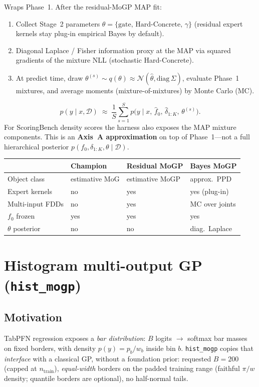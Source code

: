 \documentclass[11pt,a4paper]{article}
\newcommand{\Ncal}{\mathcal{N}}
\newcommand{\Dcal}{\mathcal{D}}
\theoremstyle{definition}
\begin{document}
Wraps Phase~1. After the residual-MoGP MAP fit:
\begin{enumerate}[leftmargin=1.4em]
\item Collect Stage~2 parameters
  $\theta=\{\text{gate},\,\text{Hard-Concrete},\,\gamma\}$
  (residual expert kernels stay plug-in empirical Bayes by default).
\item Diagonal Laplace / Fisher information proxy at the MAP via squared
  gradients of the mixture NLL (stochastic Hard-Concrete).
\item At predict time, draw
  $\theta^{(s)}\sim q(\theta)\approx\Ncal(\hat\theta,\mathrm{diag}\,\Sigma)$,
  evaluate Phase~1 mixtures, and average moments (mixture-of-mixtures) by Monte
  Carlo (MC).
\end{enumerate}

\[
  p(y\mid x,\Dcal)
  \;\approx\;
  \frac{1}{S}\sum_{s=1}^{S}
  p\bigl(y\mid x,\,\hat f_0,\,\hat\delta_{1:K},\,\theta^{(s)}\bigr).
\]
For ScoringBench density scores the harness also exposes the MAP mixture
components. This is an \textbf{Axis~A approximation} on top of Phase~1---not a
full hierarchical posterior $p(f_0,\delta_{1:K},\theta\mid\Dcal)$.

\begin{center}
\renewcommand{\arraystretch}{1.1}
\begin{tabular}{@{}llll@{}}
\toprule
 & Champion & Residual MoGP & Bayes MoGP \\
\midrule
Object class & estimative MoG & estimative MoGP & approx.\ PPD \\
Expert kernels & no & yes & yes (plug-in) \\
Multi-input FDDs & no & yes & MC over joints \\
$f_0$ frozen & yes & yes & yes \\
$\theta$ posterior & no & no & diag.\ Laplace \\
\bottomrule
\end{tabular}
\end{center}

\section{Histogram multi-output GP (\texttt{hist\_mogp})}
\label{sec:hist-mogp}

\subsection{Motivation}
TabPFN regression exposes a \emph{bar distribution}: $B$ logits $\to$ softmax bar
masses on fixed borders, with density $p(y)=p_b/w_b$ inside bin $b$.
\texttt{hist\_mogp} copies that \emph{interface} with a classical GP, without a
foundation prior: requested $B{=}200$ (capped at $n_{\mathrm{train}}$),
\emph{equal-width} borders on the padded training range (faithful $\pi/w$
density; quantile borders are optional), no half-normal tails.
\end{document}
